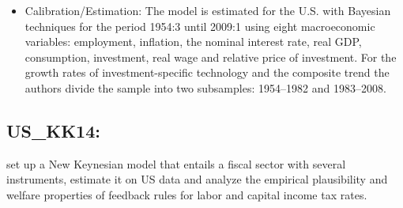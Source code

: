 \documentclass[11pt,a4paper]{article}
\begin{document}
\begin{itemize}
		\item Calibration/Estimation: The model is estimated for the U.S. with Bayesian techniques for the period 1954:3 until 2009:1 using eight macroeconomic variables: employment, inflation, the nominal interest rate, real GDP, consumption, investment, real wage and relative price of investment. For the growth rates of investment-specific technology and the composite trend the authors divide the sample into two subsamples: 1954--1982 and 1983--2008.
	\end{itemize}
	
	
	
	\subsection{US\_KK14: \texorpdfstring{\cite{kliem2014kriwoluzky}}{Kliem and Kriwoluzky (2014)}}
	\label{USKK14}
	\cite{kliem2014kriwoluzky} set up a New Keynesian model that entails a fiscal sector with several instruments, estimate it on US data and analyze the empirical plausibility and welfare properties of feedback rules for labor and capital income tax rates.
	
\end{document}
